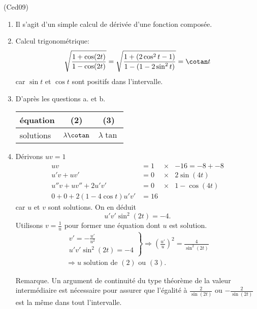 \begin{tiny}(Ced09)\end{tiny}
\begin{enumerate}
  \item Il s'agit d'un simple calcul de dérivée d'une fonction composée. 
  \item Calcul trigonométrique:
\[
\sqrt{\frac{1 + \cos(2t)}{1 - \cos(2t)}}
= \sqrt{\frac{1 + (2\cos^2 t -1)}{1 - (1-2\sin^2t)}}
= \cotan t
\]
car $\sin t$ et $\cos t$ sont positifs dans l'intervalle.

  \item D'après les questions a. et b. 
 \begin{center}
 \renewcommand{\arraystretch}{1.2}
\begin{tabular}{|l|c|c|} \hline
équation  & (2)              & (3)\\ \hline
solutions & $\lambda \cotan$ & $\lambda \tan$ \\ \hline
 \end{tabular}
 \end{center}

  \item Dérivons $uv = 1$
\[
\begin{aligned}
  uv                   &= 1 &\times& -16 = -8 +-8 \\
  u'v + uv'            &= 0 &\times& 2\sin(4t) \\
  u''v + uv'' + 2 u'v' &= 0 &\times& 1 - \cos(4t) \\ \hline
  0 + 0 + 2(1-4 \cos t) u'v' &= 16 &  &
\end{aligned}
\]
car $u$ et $v$ sont solutions. On en déduit
\[
  u'v'\sin^2(2t) = -4 .
\]
Utilisons $v = \frac{1}{u}$ pour former une équation dont $u$ est solution.
\begin{multline*}
\left.
\begin{aligned}
  v' = -\frac{u'}{u^2} \\ u'v'\sin^2(2t) = -4  
\end{aligned}
\right\rbrace 
\Rightarrow \left( \frac{u'}{u} \right)^2 = \frac{4}{\sin^2(2t)}\\
\Rightarrow 
u \text{ solution  de $(2)$ ou $(3)$}.
\end{multline*}

Remarque. Un argument de continuité du type théorème de la valeur intermédiaire est nécessaire pour assurer que l'égalité à $\frac{2}{\sin(2t)}$ ou $-\frac{2}{\sin(2t)}$ est la même dans tout l'intervalle.
\end{enumerate}
